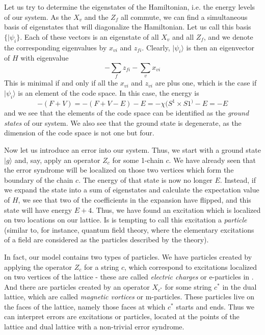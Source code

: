 \documentclass[a4paper, draft]{article}
\theoremstyle{own}
\theoremstyle{remark}
\begin{document}
Let us try to determine the eigenstates of the Hamiltonian, i.e. the energy levels of our system. As the $X_v$ and the $Z_f$ all commute, we can find a simultaneous basis of eigenstates that will diagonalize the Hamiltonian. Let us call this basis $\{ |\psi_i \}$. Each of these vectors is an eigenstate of all $X_v$ and all $Z_f$, and we denote the corresponding eigenvalues by $x_{vi}$ and $z_{fi}$. Clearly, $|\psi_i \rangle$ is then an eigenvector of $H$ with eigenvalue
$$
- \sum_f z_{fi} - \sum_v x_{vi}
$$
This is minimal if and only if all the $x_{vi}$ and $z_{vi}$ are plus one, which is the case if $|\psi_i \rangle$ is an element of the code space. In this case, the energy is
$$
- (F + V) = - (F + V - E) - E = - \chi(S^1 \times S1^) - E = - E
$$
and we see that the elements of the code space can be identified as the \emph{ground states} of our system. We also see that the ground state is degenerate, as the dimension of the code space is not one but four.

Now let us introduce an error into our system. Thus, we start with a ground state $|g \rangle$ and, say, apply an operator $Z_c$ for some 1-chain $c$. We have already seen that the error syndrome will be localized on those two vertices which form the boundary of the chain $c$. The energy of that state is now no longer $E$. Instead, if we expand the state into a sum of eigenstates and calculate the expectation value of $H$, we see that two of the coefficients in the expansion have flipped, and this state will have energy $E + 4$. Thus, we have found an excitation which is localized on two locations on our lattice. Is is tempting to call this excitation a \emph{particle} (similar to, for instance, quantum field theory, where the elementary excitations of a field are considered as the particles described by the theory).

In fact, our model contains two types of particles. We have particles created by applying the operator $Z_c$ for a string $c$, which correspond to excitations localized on two vertices of the lattice - these are called \emph{electric charges} or e-particles in \cite{Kitaev}. And there are particles created by an operator $X_{c^*}$ for some string $c^*$ in the dual lattice, which are called \emph{magnetic vortices} or m-particles. These particles live on the faces of the lattice, namely those faces at which $c^*$ starts and ends. Thus we can interpret errors are excitations or particles, located at the points of the lattice and dual lattice with a non-trivial error syndrome. 
\end{document}
